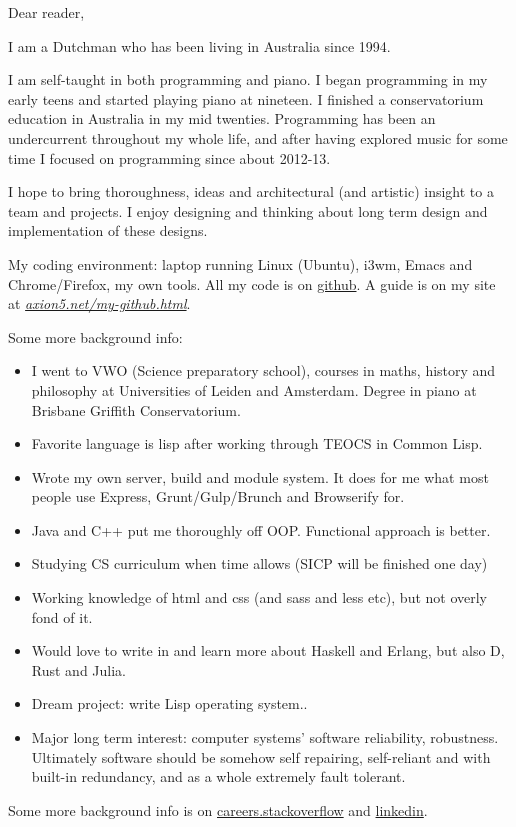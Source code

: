 \documentclass[11pt]{article}
\author{Michiel van Oosten}
\date{\today}
\title{}
\begin{document}
\tableofcontents

Dear reader,

I am a Dutchman who has been living in Australia since 1994.

I am self-taught in both programming and piano. I began programming in my early
teens and started playing piano at nineteen. I finished a conservatorium
education in Australia in my mid twenties. Programming has been an undercurrent
throughout my whole life, and after having explored music for some time I
focused on programming since about 2012-13.

I hope to bring thoroughness, ideas and architectural (and artistic) insight to
a team and projects. I enjoy designing and thinking about long term design and
implementation of these designs.

My coding environment: laptop running Linux (Ubuntu), i3wm, Emacs and
Chrome/Firefox, my own tools. All my code is on \href{http://github.com/michieljoris}{github}. A guide is on my site at
\emph{\href{https://www.axion5.net/my-github.html}{axion5.net/my-github.html}}.

Some more background info:

\begin{itemize}
\item I went to VWO (Science preparatory school), courses in maths, history and philosophy at Universities of Leiden and Amsterdam. Degree in piano at Brisbane Griffith Conservatorium.
\item Favorite language is lisp after working through TEOCS in Common Lisp.
\item Wrote my own server, build and module system. It does for me what most people use Express, Grunt/Gulp/Brunch and Browserify for.
\item Java and C++ put me thoroughly off OOP. Functional approach is better.
\item Studying CS curriculum when time allows (SICP will be finished one day)
\item Working knowledge of html and css (and sass and less etc), but not overly fond of it.
\item Would love to write in and learn more about Haskell and Erlang, but also D, Rust and Julia.
\item Dream project: write Lisp operating system..
\item Major long term interest: computer systems' software reliability, robustness. Ultimately
software should be somehow self repairing, self-reliant and with built-in
redundancy, and as a whole extremely fault tolerant.
\end{itemize}

Some more background info is on \href{http://careers.stackoverflow.com/michieljoris}{careers.stackoverflow} and \href{http://nl.linkedin.com/in/michieljoris/}{linkedin}.
\end{document}
